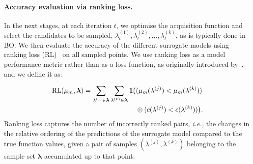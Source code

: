 \paragraph{Accuracy evaluation via ranking loss.}
In the next stages, at each iteration $t$, we optimise the acquisition function and select the candidates to be sampled, $\lambda_t^{(1)},\lambda_t^{(2)},\dots,\lambda_t^{{(k)}}$, as is typically done in BO. We then evaluate the accuracy of the different surrogate models using ranking loss (RL)~\citep{FeuEtAl22} on all sampled points. 
We use ranking loss as a model performance metric 
rather than as a loss function, as originally introduced by~\citet{WisEtAl16}, and we define it as:

\begin{equation}
\label{eq:ch05:rl}
    \begin{aligned}
       \text{RL}(\mu_m, \boldsymbol{\lambda}) = 
        \sum_{\lambda^{(j)}\in \boldsymbol{\lambda}} 
        \sum_{\lambda^{(k)}\in \boldsymbol{\lambda}} 
        {1\kern-0.25em\text{l}}\big(
        &(\mu_m(\lambda^{(j)}) < \mu_m(\lambda^{(k)})) \\
        &\oplus (c(\lambda^{(j)}) < c(\lambda^{(k)}))
        \big).
    \end{aligned}
\end{equation}
Ranking loss captures the number of incorrectly ranked pairs, \emph{i.e.,} the changes in the relative ordering of the predictions of the surrogate model compared to the true function values, given a pair of samples $(\lambda^{(j)},\lambda^{(k)})$ belonging to the sample set $\boldsymbol{\lambda}$ accumulated up to that point.

